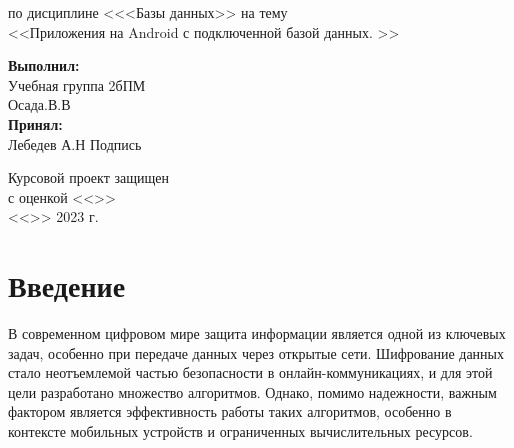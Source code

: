 \documentclass[12pt]{article}
\begin{document}
\begin{titlepage}
\begin{center}
            по дисциплине <<<Базы данных>>
            на тему\\
            <<Приложения на Android с подключенной базой данных. >>
        \end{center}

        \hfill \begin{minipage}{0.5\linewidth}
                   \textbf{Выполнил:}\\
                   Учебная группа 2бПМ\\
                   Осада.В.В\\
                   \textbf{Принял:
                   }\\
                   Лебедев А.Н
                   Подпись \underline{\hspace{1cm}}\\
        \end{minipage}
        \vspace{1 cm}
        \begin{minipage}{0.45\linewidth}
            Курсовой проект защищен\\ с оценкой <<\underline{\hspace{1cm}}>>\\
            <<\underline{\hspace{0.7cm}}>> \underline{\hspace{2cm}} 2023 г.
        \end{minipage}
        \begin{minipage}{0.55\linewidth}
        \end{minipage}
        \vspace{5 cm}
    \end{titlepage}

    \tableofcontents
    \newpage


    \section{Введение}

    В современном цифровом мире защита информации является одной из ключевых задач, особенно при передаче данных через открытые сети.
    Шифрование данных стало неотъемлемой частью безопасности в онлайн-коммуникациях, и для этой цели разработано множество алгоритмов.
    Однако, помимо надежности, важным фактором является эффективность работы таких алгоритмов, особенно в контексте мобильных устройств и ограниченных вычислительных ресурсов.
\end{document}
